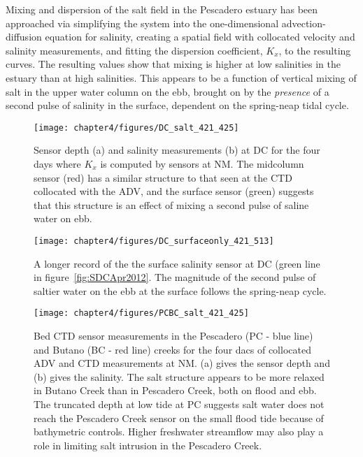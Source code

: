 Mixing and dispersion of the salt field in the Pescadero estuary has been approached via simplifying the system into the one-dimensional advection-diffusion equation for salinity, creating a spatial field with collocated velocity and salinity measurements, and fitting the dispersion coefficient, $K_x$, to the resulting curves. The resulting values show that mixing is higher at low salinities in the estuary than at high salinities. This appears to be a function of vertical mixing of salt in the upper water column on the ebb, brought on by the \emph{presence} of a second pulse of salinity in the surface, dependent on the spring-neap tidal cycle.  






\begin{figure}
	\texttt{[image: chapter4/figures/DC\_salt\_421\_425]}
	\caption{Sensor depth (a) and salinity measurements (b) at DC for the four days where $K_x$ is computed by sensors at NM. The midcolumn sensor (red) has a similar structure to that seen at the CTD collocated with the ADV, and the surface sensor (green) suggests that this structure is an effect of mixing a second pulse of saline water on ebb.} \label{fig:SDCApr2012} \label{fig:DC_salt_421_425}
\end{figure}


\begin{figure}
	\texttt{[image: chapter4/figures/DC\_surfaceonly\_421\_513]}
	\caption{A longer record of the the surface salinity sensor at DC (green line in figure~\ref{fig:SDCApr2012}. The magnitude of the second pulse of saltier water on the ebb at the surface follows the spring-neap cycle.} \label{fig:SsurfLT}
\end{figure}


\begin{figure}
	\texttt{[image: chapter4/figures/PCBC\_salt\_421\_425]}
	\caption{Bed CTD sensor measurements in the Pescadero (PC - blue line) and Butano (BC  - red line) creeks for the four dacs of collocated ADV and CTD measurements at NM. (a) gives the sensor depth and (b) gives the salinity. The salt structure appears to be more relaxed in Butano Creek than in Pescadero Creek, both on flood and ebb. The truncated depth at low tide at PC suggests salt water does not reach the Pescadero Creek sensor on the small flood tide because of bathymetric controls. Higher freshwater streamflow may also play a role in limiting salt intrusion in the Pescadero Creek.} \label{fig:PCBC421:425}
\end{figure}



